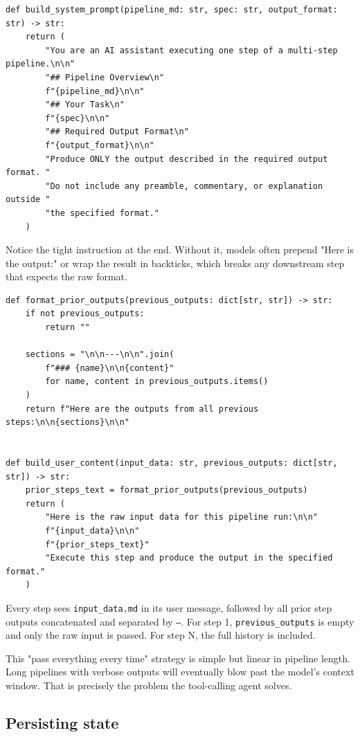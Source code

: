 \documentclass[12pt, a4paper]{article}
\begin{document}
\begin{lstlisting}[style=pythonstyle]
def build_system_prompt(pipeline_md: str, spec: str, output_format: str) -> str:
    return (
        "You are an AI assistant executing one step of a multi-step pipeline.\n\n"
        "## Pipeline Overview\n"
        f"{pipeline_md}\n\n"
        "## Your Task\n"
        f"{spec}\n\n"
        "## Required Output Format\n"
        f"{output_format}\n\n"
        "Produce ONLY the output described in the required output format. "
        "Do not include any preamble, commentary, or explanation outside "
        "the specified format."
    )
\end{lstlisting}

Notice the tight instruction at the end. Without it, models often prepend "Here is the output:" or wrap the result in backticks, which breaks any downstream step that expects the raw format.

\begin{lstlisting}[style=pythonstyle]
def format_prior_outputs(previous_outputs: dict[str, str]) -> str:
    if not previous_outputs:
        return ""

    sections = "\n\n---\n\n".join(
        f"### {name}\n\n{content}"
        for name, content in previous_outputs.items()
    )
    return f"Here are the outputs from all previous steps:\n\n{sections}\n\n"


def build_user_content(input_data: str, previous_outputs: dict[str, str]) -> str:
    prior_steps_text = format_prior_outputs(previous_outputs)
    return (
        "Here is the raw input data for this pipeline run:\n\n"
        f"{input_data}\n\n"
        f"{prior_steps_text}"
        "Execute this step and produce the output in the specified format."
    )
\end{lstlisting}

Every step sees \texttt{input\_data.md} in its user message, followed by all prior step outputs concatenated and separated by \texttt{---}. For step 1, \texttt{previous\_outputs} is empty and only the raw input is passed. For step N, the full history is included.

\begin{warnbox}
This "pass everything every time" strategy is simple but linear in pipeline length. Long pipelines with verbose outputs will eventually blow past the model's context window. That is precisely the problem the tool-calling agent solves.
\end{warnbox}

\subsection{Persisting state}
\end{document}
